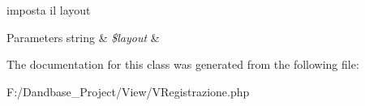 imposta il layout


\begin{DoxyParams}[1]{Parameters}
string & {\em \$layout} & \\
\hline
\end{DoxyParams}


The documentation for this class was generated from the following file\+:\begin{DoxyCompactItemize}
\item 
F\+:/\+Dandbase\+\_\+\+Project/\+View/V\+Registrazione.\+php\end{DoxyCompactItemize}
